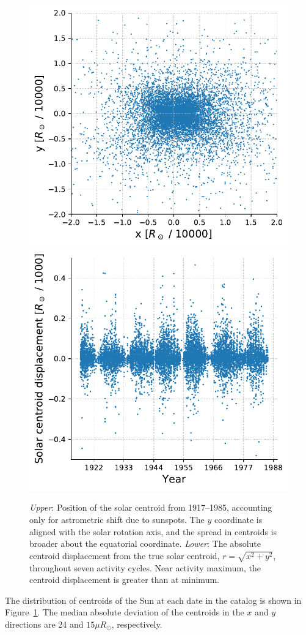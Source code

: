 \begin{figure}
\begin{center}
\includegraphics[scale=0.6]{gaia/photocenter_motion.pdf}
\includegraphics[scale=0.6]{gaia/solar_centroid_displacement.pdf}
\end{center}
\caption{\textsl{Upper}: Position of the solar centroid from 1917--1985, accounting only for astrometric shift due to sunspots. The $y$ coordinate is aligned with the solar rotation axis, and the spread in centroids is broader about the equatorial coordinate. \textsl{Lower}: The absolute centroid displacement from the true solar centroid, $r=\sqrt{x^2+y^2}$, throughout seven activity cycles. Near activity maximum, the centroid displacement is greater than at minimum.} \label{fig:centroid}
\end{figure}
The distribution of centroids of the Sun at each date in the \citet{Howard1984} catalog is shown in Figure~\ref{fig:centroid}. The median absolute deviation of the centroids in the $x$ and $y$ directions are 24 and $15 \mu R_\odot$, respectively. 

